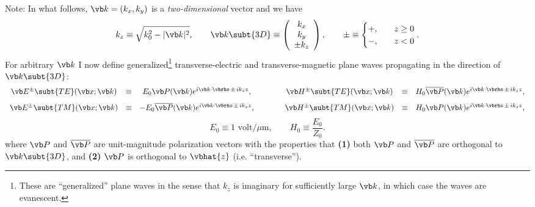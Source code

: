 \documentclass[letterpaper]{article}
\begin{document}
Note: In what follows,
$\vb k=(k_x,k_y)$ is a \textit{two-dimensional} vector and we have
$$ k_z \equiv \sqrt{k_0^2 - |\vb k|^2}, 
   \qquad
   \vb k\subt{3D}\equiv
   \left(\begin{array}{c}k_x \\ k_y \\ \pm k_z \end{array}\right), 
   \qquad
   \pm \equiv
   \begin{cases}
     +, \quad & z\ge 0 \\ 
     -, \quad & z<   0
   \end{cases}.
$$
For arbitrary $\vb k$ I now define generalized\footnote{These 
are ``generalized'' plane waves in the sense that $k_z$ is 
imaginary for sufficiently large $\vb k$, in which case the 
waves are evanescent.} transverse-electric and
transverse-magnetic plane waves propagating in the direction
of $\vb k\subt{3D}$:
$$\begin{array}{ccccccc}
 \vb E^{\pm} \subt{TE}(\vb x; \vb k)
   &\equiv& E_0 \vb P(\vb k) e^{i\vb k \cdot \vbrho \, \pm \, ik_z z},
   &\qquad&
 \vb H^{\pm} \subt{TE}(\vb x; \vb k)
   &\equiv& H_0 \overline{\vb P}(\vb k) e^{i\vb k \cdot \vbrho \, \pm \, ik_z z},
\\[8pt]
 \vb E^{\pm} \subt{TM}(\vb x; \vb k)
   &\equiv& -E_0 \overline{\vb P}(\vb k) e^{i\vb k \cdot \vbrho \, \pm \, ik_z z},
   &\qquad&
 \vb H^{\pm} \subt{TM}(\vb x; \vb k)
   &\equiv& H_0 \vb P(\vb k) e^{i\vb k \cdot \vbrho \, \pm \, ik_z z},
\end{array}$$
$$ E_0 \equiv 1 \text{ volt/$\mu$m}, \qquad H_0\equiv \frac{E_0}{Z_0}.$$
where $\vb P$ and $\overline{\vb P}$ are unit-magnitude
polarization vectors with the properties
that \textbf{(1)} both $\vb P$ and $\overline{\vb P}$ are
orthogonal to $\vb k\subt{3D}$, and
\textbf{(2)} $\vb P$ is orthogonal to $\vbhat{z}$ (i.e. ``transverse'').
\end{document}
